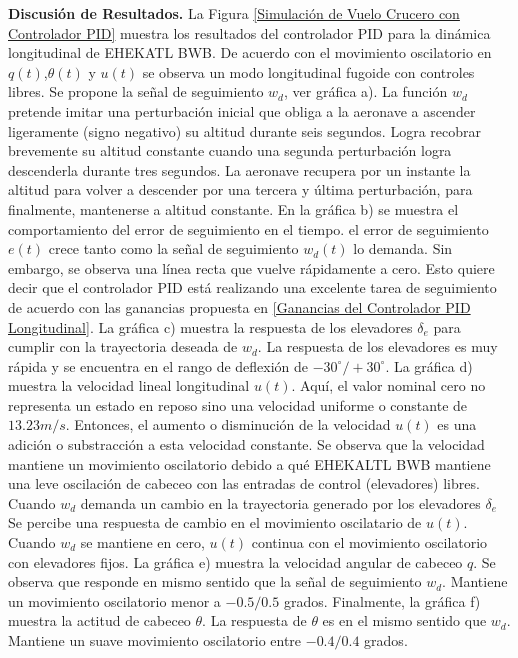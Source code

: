 \textbf{Discusión de Resultados.} La Figura \ref{Simulación de Vuelo Crucero con Controlador PID} muestra los resultados del controlador PID para la dinámica longitudinal de EHEKATL BWB. De acuerdo con el movimiento oscilatorio en $q(t)$,$\theta(t)$ y $u(t)$ se observa un modo longitudinal fugoide con controles libres. Se propone la señal de seguimiento $w_d$, ver gráfica a). La función $w_d$ pretende imitar una perturbación inicial que obliga a la aeronave a ascender ligeramente (signo negativo) su altitud durante seis segundos. Logra recobrar brevemente su altitud constante cuando una segunda perturbación logra descenderla durante tres segundos. La aeronave recupera por un instante la altitud para volver a descender por una tercera y última perturbación,  para finalmente, mantenerse a altitud constante. 
%
En la gráfica b) se muestra el comportamiento del error de seguimiento en el tiempo. el error de seguimiento $e(t)$ crece tanto como la señal de seguimiento $w_d (t)$ lo demanda. Sin embargo, se observa una línea recta que vuelve rápidamente a cero. Esto quiere decir que el controlador PID está realizando una excelente tarea de seguimiento de acuerdo con las ganancias propuesta en \ref{Ganancias del Controlador PID Longitudinal}. 
%
La gráfica c) muestra la respuesta de los elevadores $\delta_e$ para cumplir con la trayectoria deseada de $w_d$. La respuesta de los elevadores es muy rápida y se encuentra en el rango de deflexión de $-30^\circ /+30 ^\circ$. 
%
La gráfica d) muestra la velocidad lineal longitudinal $u(t)$. Aquí, el valor nominal cero no representa un estado en reposo sino una velocidad uniforme o constante de $13.23m/s$. Entonces, el aumento o disminución de la velocidad $u(t)$ es una adición o substracción a esta velocidad constante. Se observa que la velocidad mantiene un movimiento oscilatorio debido a qué EHEKALTL BWB mantiene una leve oscilación de cabeceo con las entradas de control (elevadores) libres. Cuando $w_d$ demanda un cambio en la trayectoria generado por los elevadores $\delta_e$ Se percibe una respuesta de cambio en el movimiento oscilatario de $u(t)$. Cuando $w_d$ se mantiene en cero, $u(t)$ continua con el movimiento oscilatorio con elevadores fijos. 
%
La gráfica e) muestra la velocidad angular de cabeceo $q$. Se observa que responde en mismo sentido que la señal de seguimiento $w_d$. Mantiene un movimiento oscilatorio menor a $-0.5/0.5$ grados. 
%
Finalmente, la gráfica f) muestra la actitud de cabeceo $\theta$. La respuesta de $\theta$ es en el mismo sentido que $w_d$. Mantiene un suave movimiento oscilatorio entre $-0.4 / 0.4$ grados. 

